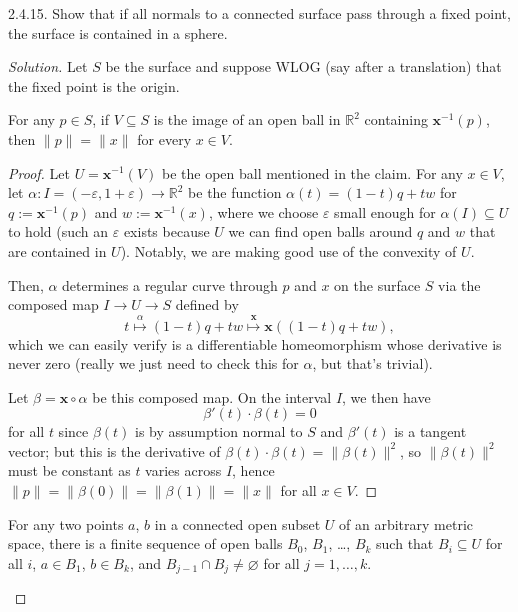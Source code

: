 \documentclass[10pt]{scrartcl}
\providecommand{\eps}{\varepsilon}
\providecommand{\RR}{\mathbb R}
\providecommand{\inv}{^{-1}}
\providecommand{\mb}[1]{\mathbf{#1}}
\newenvironment{soln}{\begin{proof}[Solution]}{\end{proof}}
\begin{document}
\begin{problem*}2.4.15.
	Show that if all normals to a connected surface pass through a fixed point,
	the surface is contained in a sphere.
\end{problem*}

\begin{soln}
	Let $S$ be the surface and suppose WLOG (say after a translation)
	that the fixed point is the origin.
	
	\begin{claim*}
		For any $p\in S$, if $V\subseteq S$ is
		the image of an open ball in $\RR^2$ containing $\mb x\inv(p)$,
		then $\|p\| = \|x\|$ for every $x\in V$.
	\end{claim*}
	\begin{proof}
		Let $U = \mb x\inv(V)$ be the open ball mentioned in the claim.
		For any $x\in V$, let $\alpha\colon I =(-\eps,1+\eps)\to \RR^2$
		be the function $\alpha(t) = (1-t)q + tw$ for 
		$q := \mb x\inv(p)$ and $w := \mb x\inv(x)$,
		where we choose $\eps$ small enough for $\alpha(I)\subseteq U$ to hold
		(such an $\eps$ exists because $U$ we can find
		open balls around $q$ and $w$ that are contained in $U$).
		Notably, we are making good use of the convexity of $U$.
		
		Then, $\alpha$ determines a regular curve through $p$ and $x$
		on the surface $S$ via the composed map $I\to U\to S$ defined by
		\[t\stackrel{\alpha}{\mapsto} (1-t)q + tw\stackrel{\mb x}{\mapsto}
		\mb x((1-t)q + tw),\]
		which we can easily verify is a differentiable homeomorphism
		whose derivative is never zero (really we just need to check this
		for $\alpha$, but that's trivial).
		
		Let $\beta = \mb x\circ\alpha$ be this composed map.
		On the interval $I$, we then have
		\[\beta'(t)\cdot\beta(t) = 0\]
		for all $t$ since $\beta(t)$ is by assumption
		normal to $S$ and $\beta'(t)$ is a tangent vector;
		but this is the derivative of $\beta(t)\cdot\beta(t) =
		\|\beta(t)\|^2$, so $\|\beta(t)\|^2$ must be constant
		as $t$ varies across $I$, hence $\|p\| = \|\beta(0)\| = \|\beta(1)\|
		= \|x\|$ for all $x\in V$.
	\end{proof}
	
	\pagebreak
	\begin{claim*}
		For any two points $a$, $b$ in a connected open subset $U$
		of an arbitrary metric space,
		there is a finite sequence of open balls $B_0$, $B_1$, \dots, $B_k$
		such that $B_i\subseteq U$ for all $i$,
		$a\in B_1$, $b\in B_k$, and $B_{j-1}\cap B_j\ne\varnothing$
		for all $j=1,\dots,k$.
	\end{claim*}


\end{soln}
\end{document}
